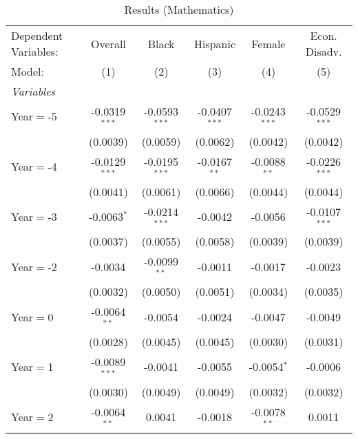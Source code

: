 
\begin{table}[htbp]
   \centering
   \caption{\label{MainResultsMath} Results (Mathematics)}
   \begin{tabular}{lccccc}
      \tabularnewline\midrule\midrule
      Dependent Variables: & Overall         & Black           & Hispanic        & Female          & Econ. Disadv.\\
      Model:               & (1)             & (2)             & (3)             & (4)             & (5)\\
      \midrule \emph{Variables} &   &   &   &   &  \\
      Year$=$-5            & -0.0319$^{***}$ & -0.0593$^{***}$ & -0.0407$^{***}$ & -0.0243$^{***}$ & -0.0529$^{***}$\\
                           & (0.0039)        & (0.0059)        & (0.0062)        & (0.0042)        & (0.0042)\\
      Year$=$-4            & -0.0129$^{***}$ & -0.0195$^{***}$ & -0.0167$^{**}$  & -0.0088$^{**}$  & -0.0226$^{***}$\\
                           & (0.0041)        & (0.0061)        & (0.0066)        & (0.0044)        & (0.0044)\\
      Year$=$-3            & -0.0063$^{*}$   & -0.0214$^{***}$ & -0.0042         & -0.0056         & -0.0107$^{***}$\\
                           & (0.0037)        & (0.0055)        & (0.0058)        & (0.0039)        & (0.0039)\\
      Year$=$-2            & -0.0034         & -0.0099$^{**}$  & -0.0011         & -0.0017         & -0.0023\\
                           & (0.0032)        & (0.0050)        & (0.0051)        & (0.0034)        & (0.0035)\\
      Year$=$0             & -0.0064$^{**}$  & -0.0054         & -0.0024         & -0.0047         & -0.0049\\
                           & (0.0028)        & (0.0045)        & (0.0045)        & (0.0030)        & (0.0031)\\
      Year$=$1             & -0.0089$^{***}$ & -0.0041         & -0.0055         & -0.0054$^{*}$   & -0.0006\\
                           & (0.0030)        & (0.0049)        & (0.0049)        & (0.0032)        & (0.0032)\\
      Year$=$2             & -0.0064$^{**}$  & 0.0041          & -0.0018         & -0.0078$^{**}$  & 0.0011\\

\end{tabular}
\end{table}
